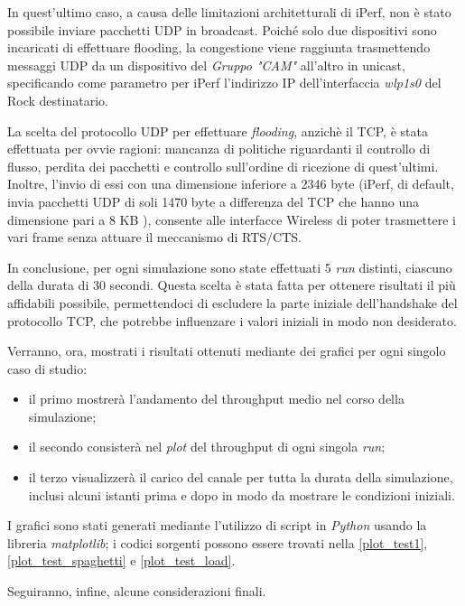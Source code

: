 In quest'ultimo caso, a causa delle limitazioni architetturali di iPerf, non è stato possibile inviare pacchetti UDP in broadcast. Poiché solo due dispositivi sono incaricati di effettuare flooding, la congestione viene raggiunta trasmettendo messaggi UDP da un dispositivo del \textit{Gruppo "CAM"} all'altro in unicast, specificando come parametro per iPerf l'indirizzo IP dell'interfaccia \textit{wlp1s0} del Rock destinatario.

La scelta del protocollo UDP per effettuare \textit{flooding}, anzichè il TCP, è stata effettuata per ovvie ragioni: mancanza di politiche riguardanti il controllo di flusso, perdita dei pacchetti e controllo sull'ordine di ricezione di quest'ultimi. Inoltre, l'invio di essi con una dimensione inferiore a 2346 byte (iPerf, di default, invia pacchetti UDP di soli 1470 byte a differenza del TCP che hanno una dimensione pari a 8 KB \cite{iperf}), consente alle interfacce Wireless di poter trasmettere i vari frame senza attuare il meccanismo di RTS/CTS.

In conclusione, per ogni simulazione sono state effettuati 5 \textit{run} distinti, ciascuno della durata di 30 secondi. Questa scelta è stata fatta per ottenere risultati il più affidabili possibile, permettendoci di escludere la parte iniziale dell'handshake del protocollo TCP, che potrebbe influenzare i valori iniziali in modo non desiderato.

Verranno, ora, mostrati i risultati ottenuti mediante dei grafici per ogni singolo caso di studio:

\begin{itemize}
    \item il primo mostrerà l'andamento del throughput medio nel corso della simulazione;
    \item il secondo consisterà nel \textit{plot} del throughput di ogni singola \textit{run};
    \item il terzo visualizzerà il carico del canale per tutta la durata della simulazione, inclusi alcuni istanti prima e dopo in modo da mostrare le condizioni iniziali.
\end{itemize}

\noindent I grafici sono stati generati mediante l'utilizzo di script in \textit{Python} usando la libreria \textit{matplotlib}; i codici sorgenti possono essere trovati nella \autoref{plot_test1}, \autoref{plot_test_spaghetti} e \autoref{plot_test_load}.

Seguiranno, infine, alcune considerazioni finali.

